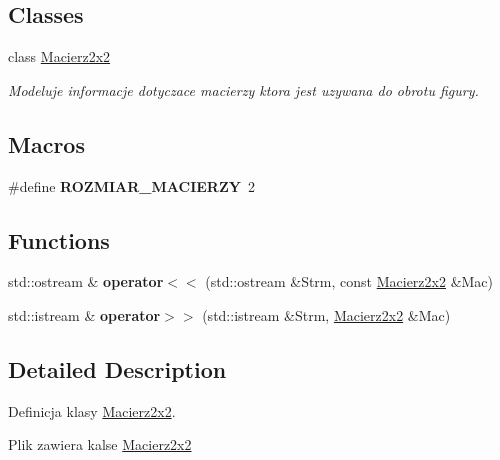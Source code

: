 \subsection*{Classes}
\begin{DoxyCompactItemize}
\item 
class \hyperlink{class_macierz2x2}{Macierz2x2}
\begin{DoxyCompactList}\small\item\em Modeluje informacje dotyczace macierzy ktora jest uzywana do obrotu figury. \end{DoxyCompactList}\end{DoxyCompactItemize}
\subsection*{Macros}
\begin{DoxyCompactItemize}
\item 
\hypertarget{_macierz2x2_8hh_a9d01784f7ff1b3fd53cb75db78488adc}{\#define {\bfseries R\+O\+Z\+M\+I\+A\+R\+\_\+\+M\+A\+C\+I\+E\+R\+Z\+Y}~2}\label{_macierz2x2_8hh_a9d01784f7ff1b3fd53cb75db78488adc}

\end{DoxyCompactItemize}
\subsection*{Functions}
\begin{DoxyCompactItemize}
\item 
\hypertarget{_macierz2x2_8hh_aa3eba72acf9e09b901351ce2bc5edf2f}{std\+::ostream \& {\bfseries operator$<$$<$} (std\+::ostream \&Strm, const \hyperlink{class_macierz2x2}{Macierz2x2} \&Mac)}\label{_macierz2x2_8hh_aa3eba72acf9e09b901351ce2bc5edf2f}

\item 
\hypertarget{_macierz2x2_8hh_a41b60a94bb9873f185ec2fe49b19eed4}{std\+::istream \& {\bfseries operator$>$$>$} (std\+::istream \&Strm, \hyperlink{class_macierz2x2}{Macierz2x2} \&Mac)}\label{_macierz2x2_8hh_a41b60a94bb9873f185ec2fe49b19eed4}

\end{DoxyCompactItemize}


\subsection{Detailed Description}
Definicja klasy \hyperlink{class_macierz2x2}{Macierz2x2}. 

Plik zawiera kalse \hyperlink{class_macierz2x2}{Macierz2x2} 